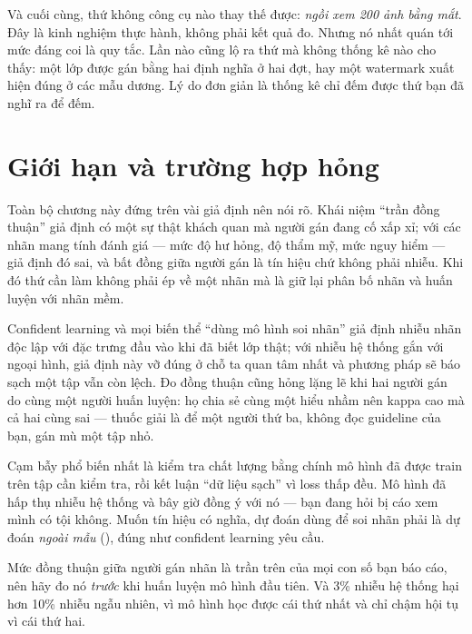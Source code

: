 \documentclass[../../deep_learning.tex]{subfiles}
\begin{document}
Và cuối cùng, thứ không công cụ nào thay thế được: \emph{ngồi xem 200 ảnh bằng mắt}. Đây là kinh nghiệm thực hành, không phải kết quả đo. Nhưng nó nhất quán tới mức đáng coi là quy tắc. Lần nào cũng lộ ra thứ mà không thống kê nào cho thấy: một lớp được gán bằng hai định nghĩa ở hai đợt, hay một watermark xuất hiện đúng ở các mẫu dương. Lý do đơn giản là thống kê chỉ đếm được thứ bạn đã nghĩ ra để đếm.

\section{Giới hạn và trường hợp hỏng}
Toàn bộ chương này đứng trên vài giả định nên nói rõ. Khái niệm ``trần đồng thuận'' giả định có một sự thật khách quan mà người gán đang cố xấp xỉ; với các nhãn mang tính đánh giá --- mức độ hư hỏng, độ thẩm mỹ, mức nguy hiểm --- giả định đó sai, và bất đồng giữa người gán là tín hiệu chứ không phải nhiễu. Khi đó thứ cần làm không phải ép về một nhãn mà là giữ lại phân bố nhãn và huấn luyện với nhãn mềm.

Confident learning và mọi biến thể ``dùng mô hình soi nhãn'' giả định nhiễu nhãn độc lập với đặc trưng đầu vào khi đã biết lớp thật; với nhiễu hệ thống gắn với ngoại hình, giả định này vỡ đúng ở chỗ ta quan tâm nhất và phương pháp sẽ báo sạch một tập vẫn còn lệch. Đo đồng thuận cũng hỏng lặng lẽ khi hai người gán do cùng một người huấn luyện: họ chia sẻ cùng một hiểu nhầm nên kappa cao mà cả hai cùng sai --- thuốc giải là để một người thứ ba, không đọc guideline của bạn, gán mù một tập nhỏ.

\begin{cambay}
Cạm bẫy phổ biến nhất là kiểm tra chất lượng bằng chính mô hình đã được train trên tập cần kiểm tra, rồi kết luận ``dữ liệu sạch'' vì loss thấp đều. Mô hình đã hấp thụ nhiễu hệ thống và bây giờ đồng ý với nó --- bạn đang hỏi bị cáo xem mình có tội không. Muốn tín hiệu có nghĩa, dự đoán dùng để soi nhãn phải là dự đoán \emph{ngoài mẫu} (), đúng như confident learning yêu cầu.
\end{cambay}

\begin{cannho}
Mức đồng thuận giữa người gán nhãn là trần trên của mọi con số bạn báo cáo, nên hãy đo nó \emph{trước} khi huấn luyện mô hình đầu tiên. Và 3\%
 nhiễu hệ thống hại hơn 10\%
nhiễu ngẫu nhiên, vì mô hình học được cái thứ nhất và chỉ chậm hội tụ vì cái thứ hai. 
\end{cannho}
\end{document}
